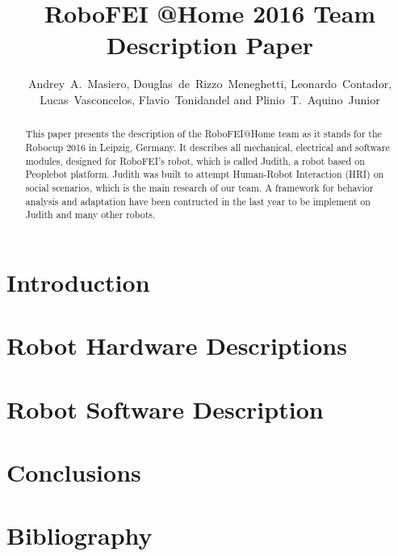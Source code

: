 \documentclass[runningheads,a4paper]{llncs}
\begin{document}
\title{RoboFEI @Home 2016 Team Description Paper}
\author{Andrey~A.~Masiero, Douglas~de~Rizzo~Meneghetti, Leonardo~Contador, Lucas~Vasconcelos, Flavio~Tonidandel and Plinio~T.~Aquino~Junior}

\maketitle



\begin{abstract}
This paper presents the description of the RoboFEI@Home team as it stands for the Robocup 2016 in Leipzig, Germany. It describes all mechanical, electrical and software modules, designed for RoboFEI's robot, which is called Judith, a robot based on Peoplebot platform. Judith was built to attempt Human-Robot Interaction (HRI) on social scenarios, which is the main research of our team. A framework for behavior analysis and adaptation have been contructed in the last year to be implement on Judith and many other robots.
\end{abstract}



\section{Introduction}


\section{Robot Hardware Descriptions}
%

\section{Robot Software Description}
%

\section{Conclusions}
%

\section{Bibliography}
%
%
\end{document}
